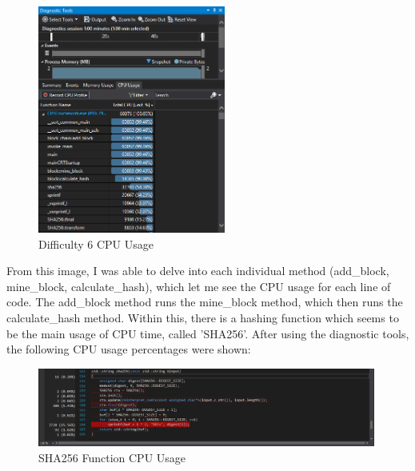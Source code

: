 \documentclass[12pt, a4paper]{article}
\begin{document}
\begin{figure}[H]
	\centering
		\includegraphics[width=0.55\textwidth]{"CPU Usage Diff(6)"}
		\caption{Difficulty 6 CPU Usage}
\end{figure}

From this image, I was able to delve into each individual method (add\_block, mine\_block, calculate\_hash), which let me see the CPU usage for each line of code. The add\_block method runs the mine\_block method, which then runs the calculate\_hash method. Within this, there is a hashing function which seems to be the main usage of CPU time, called 'SHA256'. After using the diagnostic tools, the following CPU usage percentages were shown: \\

\begin{figure}[H]
	\centering
		\includegraphics[width=0.99\textwidth]{"SHA256"}
		\caption{SHA256 Function CPU Usage}
\end{figure}
\end{document}
